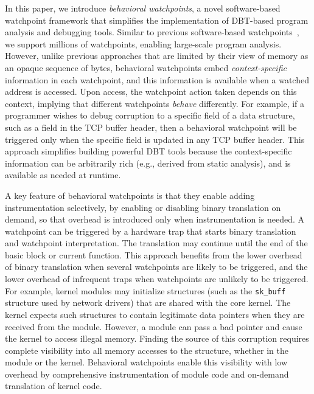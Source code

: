 \documentclass[letterpaper,twocolumn,10pt]{article}
\begin{document}
In this paper, we introduce \emph{behavioral watchpoints}, a novel software-based watchpoint framework that simplifies the implementation of DBT-based program analysis and debugging tools. Similar to previous software-based watchpoints~\cite{DynamoRIOWatchpoints}, we support millions of watchpoints, enabling large-scale program analysis. However, unlike previous approaches that are limited by their view of memory as an opaque sequence of bytes, behavioral watchpoints embed \emph{context-specific} information in each watchpoint, and this information is available when a watched address is accessed. Upon access, the watchpoint action taken depends on this context, implying that different watchpoints \emph{behave} differently. For example, if a programmer wishes to debug corruption to a specific field of a data structure, such as a field in the TCP buffer header, then a behavioral watchpoint will be triggered only when the specific field is updated in any TCP buffer header. This approach simplifies building powerful DBT tools because the context-specific information can be arbitrarily rich (e.g., derived from static analysis), and is available as needed at runtime. 

A key feature of behavioral watchpoints is that they enable adding instrumentation selectively, by enabling or disabling binary translation on demand, so that overhead is introduced only when instrumentation is needed. A watchpoint can be triggered by a hardware trap that starts binary translation and watchpoint interpretation. The translation may continue until the end of the basic block or current function. This approach benefits from the lower overhead of binary translation when several watchpoints are likely to be triggered, and the lower overhead of infrequent traps when watchpoints are unlikely to be triggered. For example, kernel modules may initialize structures (such as the \texttt{sk\_buff} structure used by network drivers) that are shared with the core kernel. The kernel expects such structures to contain legitimate data pointers when they are received from the module. However, a module can pass a bad
pointer and cause the kernel to access illegal memory. Finding the source of this corruption requires complete visibility into all memory accesses to the structure, whether in the module or the kernel. Behavioral watchpoints enable this visibility with low overhead by comprehensive instrumentation of module code and on-demand translation of kernel code. %
\end{document}
